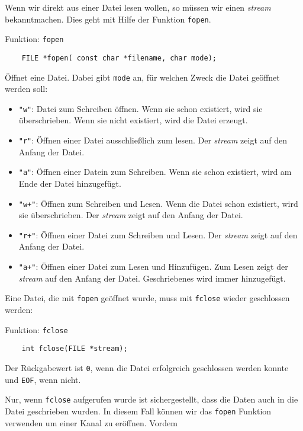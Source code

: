 Wenn wir direkt aus einer Datei lesen wollen, so müssen wir einen \emph{stream} bekanntmachen.
Dies geht mit Hilfe der Funktion \verb|fopen|.
\begin{myexampleblock}{Funktion: \texttt{fopen}}
  \begin{lstlisting}
    FILE *fopen( const char *filename, char mode);
  \end{lstlisting}
  \vspace{-0.4cm}
  Öffnet eine Datei. Dabei gibt \texttt{mode} an, für welchen Zweck die Datei geöffnet werden soll:
  \begin{itemize} 
    \itemsep0.5ex
  \item \texttt{"w"}: Datei zum Schreiben öffnen. Wenn sie schon existiert, wird sie überschrieben. Wenn sie nicht existiert, wird die Datei erzeugt.
  \item \texttt{"r"}: Öffnen einer Datei ausschließlich zum lesen. Der \emph{stream} zeigt auf den Anfang der Datei.
  \item \texttt{"{}a"}: Öffnen einer Datein zum Schreiben. Wenn sie schon existiert, wird am Ende der Datei hinzugefügt.
  \item \texttt{"w+"}: Öffnen zum Schreiben und Lesen. Wenn die Datei schon existiert, wird sie überschrieben. Der \emph{stream} zeigt auf den Anfang der Datei.
  \item \texttt{"r+"}: Öffnen einer Datei zum Schreiben und Lesen. Der \emph{stream} zeigt auf den Anfang der Datei.
  \item \texttt{"{}a+"}: Öffnen einer Datei zum Lesen und Hinzufügen. Zum Lesen zeigt der \emph{stream} auf den Anfang der Datei. Geschriebenes wird immer hinzugefügt.
  \end{itemize}
\end{myexampleblock}  
Eine Datei, die mit \texttt{fopen} geöffnet wurde, muss mit \texttt{fclose} wieder geschlossen werden:
\begin{myexampleblock}{Funktion: \texttt{fclose}}
  \begin{lstlisting}
    int fclose(FILE *stream);
  \end{lstlisting}
  \vspace{-0.4cm}
  Der Rückgabewert ist \texttt{0}, wenn die Datei erfolgreich geschlossen werden konnte und \texttt{EOF}, wenn nicht.
\end{myexampleblock}
Nur, wenn \texttt{fclose} aufgerufen wurde ist sichergestellt, dass die Daten auch in die Datei geschrieben wurden.
In diesem Fall können wir das \texttt{fopen} Funktion verwenden um einer Kanal zu eröffnen. Vordem
